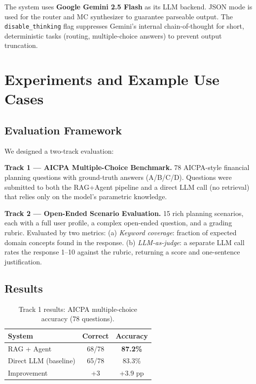 \documentclass[sigplan,screen]{acmart}
\begin{document}
The system uses \textbf{Google Gemini 2.5 Flash} as its LLM backend.
JSON mode is used for the router and MC synthesizer to guarantee parseable output.
The \texttt{disable\_thinking} flag suppresses Gemini's internal chain-of-thought for short, deterministic tasks (routing, multiple-choice answers) to prevent output truncation.

\section{Experiments and Example Use Cases}

\subsection{Evaluation Framework}

We designed a two-track evaluation:

\textbf{Track 1 — AICPA Multiple-Choice Benchmark.}
78 AICPA-style financial planning questions with ground-truth answers (A/B/C/D).
Questions were submitted to both the RAG+Agent pipeline and a direct LLM call (no retrieval) that relies only on the model's parametric knowledge.

\textbf{Track 2 — Open-Ended Scenario Evaluation.}
15 rich planning scenarios, each with a full user profile, a complex open-ended question, and a grading rubric.
Evaluated by two metrics:
(a) \emph{Keyword coverage}: fraction of expected domain concepts found in the response.
(b) \emph{LLM-as-judge}: a separate LLM call rates the response 1--10 against the rubric, returning a score and one-sentence justification.

\subsection{Results}

\begin{table}[h]
\caption{Track 1 results: AICPA multiple-choice accuracy (78 questions).}
\label{tab:mc}
\begin{tabular}{lcc}
\toprule
System & Correct & Accuracy \\
\midrule
RAG + Agent & 68/78 & \textbf{87.2\%} \\
Direct LLM (baseline) & 65/78 & 83.3\% \\
\midrule
Improvement & +3 & +3.9 pp \\
\bottomrule
\end{tabular}
\end{table}
\end{document}
